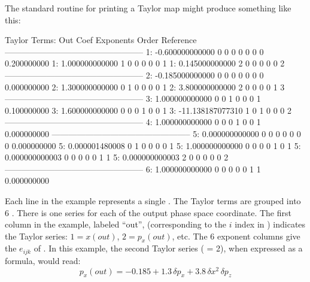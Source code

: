 The standard \bmad routine for printing a Taylor map might produce something 
like this: 
\begin{example}
   Taylor Terms:
   Out      Coef             Exponents          Order       Reference
   --------------------------------------------------
    1:     -0.600000000000   0  0  0  0  0  0       0       0.200000000
    1:      1.000000000000   1  0  0  0  0  0       1
    1:      0.145000000000   2  0  0  0  0  0       2
   --------------------------------------------------
    2:     -0.185000000000   0  0  0  0  0  0       0       0.000000000
    2:      1.300000000000   0  1  0  0  0  0       1
    2:      3.800000000000   2  0  0  0  0  1       3
   --------------------------------------------------
    3:      1.000000000000   0  0  1  0  0  0       1       0.100000000
    3:      1.600000000000   0  0  0  1  0  0       1
    3:    -11.138187077310   1  0  1  0  0  0       2
   --------------------------------------------------
    4:      1.000000000000   0  0  0  1  0  0       1       0.000000000
   --------------------------------------------------
    5:      0.000000000000   0  0  0  0  0  0       0       0.000000000
    5:      0.000001480008   0  1  0  0  0  0       1
    5:      1.000000000000   0  0  0  0  1  0       1
    5:      0.000000000003   0  0  0  0  0  1       1
    5:      0.000000000003   2  0  0  0  0  0       2
   --------------------------------------------------
    6:      1.000000000000   0  0  0  0  0  1       1       0.000000000
\end{example}
Each line in the example represents a single . The
Taylor terms are grouped into 6 . There is one
series for each of the output phase space coordinate. The first
column in the example, labeled ``out'', (corresponding to the $i$
index in ) indicates the Taylor series: $1 = x(out)$, $2 =
p_x(out)$, etc. The 6 exponent columns give the $e_{ijk}$ of
. In this example, the second Taylor series ( = 2),
when expressed as a formula, would read:
\begin{equation}
  p_x(out) = -0.185 + 1.3 \, \delta p_x + 3.8 \, \delta x^2 \, \delta p_z
\end{equation}

